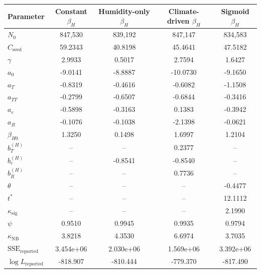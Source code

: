 \begin{center}
\label{tab:supp_best_fit_comparison_reported}
\small
\begin{tabular}{lcccc}
\toprule
Parameter & Constant $\beta_H$ & Humidity-only $\beta_H$ & Climate-driven $\beta_H$ & Sigmoid $\beta_H$ \\
\midrule
$N_0$ & 847,530 & 839,192 & 847,147 & 834,583 \\
$C_{\mathrm{seed}}$ & 59.2343 & 40.8198 & 45.4641 & 47.5182 \\
$\gamma$ & 2.9933 & 0.5017 & 2.7594 & 1.6427 \\
$a_0$ & -9.0141 & -8.8887 & -10.0730 & -9.1650 \\
$a_T$ & -0.8319 & -0.4616 & -0.6082 & -1.1508 \\
$a_{TT}$ & -0.2799 & -0.6507 & -0.6844 & -0.3416 \\
$a_e$ & -0.5898 & -0.3163 & 0.1383 & -0.3942 \\
$a_R$ & -0.1076 & -0.1038 & -2.1398 & -0.0621 \\
$\beta_{H0}$ & 1.3250 & 0.1498 & 1.6997 & 1.2104 \\
$b_T^{(H)}$ & -- & -- & 0.2377 & -- \\
$b_e^{(H)}$ & -- & -0.8541 & -0.8540 & -- \\
$b_R^{(H)}$ & -- & -- & 0.7736 & -- \\
$\theta$ & -- & -- & -- & -0.4477 \\
$t^{*}$ & -- & -- & -- & 12.1112 \\
$\kappa_{\mathrm{sig}}$ & -- & -- & -- & 2.1990 \\
$\psi$ & 0.9510 & 0.9945 & 0.9935 & 0.9794 \\
$\kappa_{\mathrm{NB}}$ & 3.8218 & 4.3530 & 6.6974 & 3.7035 \\
\midrule
$\mathrm{SSE}_{\mathrm{reported}}$ & 3.454e+06 & 2.030e+06 & 1.569e+06 & 3.392e+06 \\
$\log L_{\mathrm{reported}}$ & -818.907 & -810.444 & -779.370 & -817.490 \\
\bottomrule
\end{tabular}
\end{center}